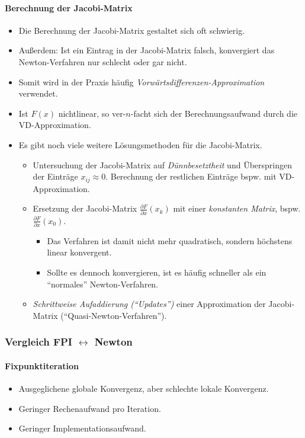 			\paragraph{Berechnung der Jacobi-Matrix} %
				\begin{itemize}
					\item Die Berechnung der Jacobi-Matrix gestaltet sich oft schwierig.
					\item Außerdem: Ist ein Eintrag in der Jacobi-Matrix falsch, konvergiert das Newton-Verfahren nur schlecht oder gar nicht.
					\item Somit wird in der Praxis häufig \textit{Vorwärtsdifferenzen-Approximation} verwendet.
					\item Ist \( F(x) \) nichtlinear, so ver-\(n\)-facht sich der Berechnungsaufwand durch die VD-Approximation.
					\item Es gibt noch viele weitere Lösungsmethoden für die Jacobi-Matrix.
						\begin{itemize}
							\item Untersuchung der Jacobi-Matrix auf \textit{Dünnbesetztheit} und Überspringen der Einträge \( x _ {ij} \approx 0 \). Berechnung der restlichen Einträge bspw. mit VD-Approximation.
							\item Ersetzung der Jacobi-Matrix \( \frac{\partial F}{\partial x} (x _ k) \) mit einer \textit{konstanten Matrix}, bspw. \( \frac{\partial F}{\partial x} (x _ 0) \).
								\begin{itemize}
									\item Das Verfahren ist damit nicht mehr quadratisch, sondern höchstens linear konvergent.
									\item Sollte es dennoch konvergieren, ist es häufig schneller als ein \enquote{normales} Newton-Verfahren.
								\end{itemize}
							\item \textit{Schrittweise Aufaddierung (\enquote{Updates})} einer Approximation der Jacobi-Matrix (\enquote{Quasi-Newton-Verfahren}).
						\end{itemize}
				\end{itemize}

		\subsubsection{Vergleich FPI \( \leftrightarrow \) Newton} %
			\paragraph{Fixpunktiteration}
				\begin{itemize}
					\item Ausgeglichene globale Konvergenz, aber schlechte lokale Konvergenz.
					\item Geringer Rechenaufwand pro Iteration.
					\item Geringer Implementationsaufwand.
				\end{itemize}

